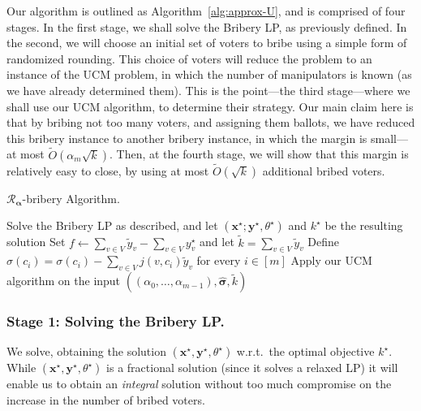 \documentclass[letterpaper]{article} %
\theoremstyle{definition}
\newcommand\vecc{\mathbf}
\newcommand\vecgreek{\bm}
\newcommand{\veca}{\vecgreek{\alpha}}
\newcommand{\Ra}{\mathcal{R}_{\veca}}
\begin{document}
Our algorithm is outlined as Algorithm~\ref{alg:approx-U}, and is comprised of four stages. In the first stage, we shall solve the Bribery LP, as previously defined. In the second, we will choose an initial set of voters to bribe using a simple form of randomized rounding.
This choice of voters will reduce the problem to an instance of the UCM problem, in which the number of manipulators is known (as we have already determined them). This is the point---the third stage---where we shall use our UCM algorithm, to determine their strategy. Our main claim here is that by bribing not too many voters, and assigning them ballots, we have reduced this bribery instance to another bribery instance, in which the margin is small---at most $\widetilde{O}(\alpha_{m}\sqrt{k})$. Then, at the fourth stage, we will show that this margin is relatively easy to close, by using at most $\widetilde{O}(\sqrt{k})$ additional bribed voters.
\begin{algorithm}[t]
	\caption{$\Ra$-bribery Algorithm.}
	\label{alg:approx-U}
	Solve the Bribery LP as described, and let $(\vecc{x^\star };\vecc{y^\star },\theta^\star )$ and $k^\star$ be the resulting solution\;
	Set $f \gets \sum_{v \in V}\tilde{y}_v - \sum_{v \in V} y^\star _v$ and let $\tilde{k}=\sum_{v \in V} \tilde{y}_v$\;
	Define  $\hat{\sigma}(c_i)= \sigma(c_i) - \sum_{v \in V}j(v,c_i) \tilde{y}_{v}$ for every $i \in [m]$\;
	Apply our UCM algorithm on the input $((\alpha_{0},\ldots,\alpha_{m-1}),\vecgreek{\hat{\sigma}}, \tilde{k})$ \;
\end{algorithm}


\subsubsection{Stage 1: Solving the Bribery LP.}
We solve, obtaining the solution $(\vecc{x^\star },\vecc{y^\star },\theta^\star )$ w.r.t.\ the optimal objective $k^\star $. While $(\vecc{x^\star },\vecc{y^\star },\theta^\star )$ is a fractional solution (since it solves a relaxed LP) it will enable us to obtain an \emph{integral} solution without too much compromise on the increase in the number of bribed voters.
\end{document}
